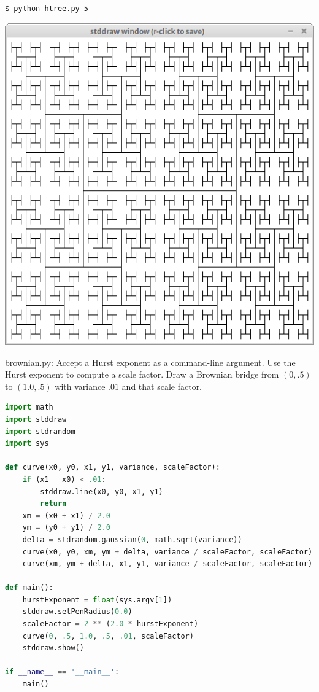\documentclass[8pt,a4paper,compress]{beamer}
\begin{document}
\begin{frame}[fragile]
\begin{minipage}{160pt}
\begin{lstlisting}[language={}]
$ python htree.py 5
\end{lstlisting}
\end{minipage}%
\begin{minipage}{140pt}
\hfill \includegraphics[scale=0.15]{figures/htree3.png}
\end{minipage}
\end{frame}

\begin{frame}[fragile]
\begin{framed}
\tiny brownian.py: Accept a Hurst exponent as a command-line argument. Use the Hurst exponent to compute a scale factor. Draw a Brownian bridge from $(0, .5)$ to $(1.0, .5)$ with variance $.01$ and that scale factor.
\end{framed}

\begin{lstlisting}[language=Python]
import math
import stddraw
import stdrandom
import sys

def curve(x0, y0, x1, y1, variance, scaleFactor):
    if (x1 - x0) < .01:
        stddraw.line(x0, y0, x1, y1)
        return
    xm = (x0 + x1) / 2.0
    ym = (y0 + y1) / 2.0
    delta = stdrandom.gaussian(0, math.sqrt(variance))
    curve(x0, y0, xm, ym + delta, variance / scaleFactor, scaleFactor)
    curve(xm, ym + delta, x1, y1, variance / scaleFactor, scaleFactor)

def main():
    hurstExponent = float(sys.argv[1])
    stddraw.setPenRadius(0.0)
    scaleFactor = 2 ** (2.0 * hurstExponent)
    curve(0, .5, 1.0, .5, .01, scaleFactor)
    stddraw.show()

if __name__ == '__main__':
    main()
\end{lstlisting}
\end{frame}
\end{document}
